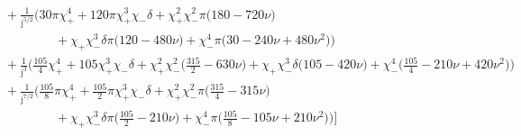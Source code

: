 \documentclass[prd,superscriptaddress,preprintnumbers,tightenlines,nofootinbib, eqsecnum]{revtex4-2}
\newcommand{\nn}{\nonumber}
\begin{document}
\begin{align}
&\qquad\quad + \frac{1}{\bar{\jmath}^{5/2}}\Bigg(30 \pi\chi_{+}^{4} + 120 \pi\chi_{+}^{3}\chi_{-}\delta + \chi_{+}^{2}\chi_{-}^{2}\pi\bigg(180 - 720 \nu\bigg)\nn \\
&\qquad\qquad\qquad\quad + \chi_{+}\chi_{-}^{3}\delta\pi\bigg(120 - 480 \nu\bigg) + \chi_{-}^{4}\pi\bigg(30 - 240 \nu + 480 \nu^{2}\bigg)\Bigg) \nn \\
&\qquad\quad + \frac{1}{\bar{\jmath}^{3}}\Bigg(\frac{105}{4}\chi_{+}^{4} + 105\chi_{+}^{3}\chi_{-}\delta + \chi_{+}^{2}\chi_{-}^{2}\bigg(\frac{315}{2} - 630 \nu\bigg) + \chi_{+}\chi_{-}^{3}\delta\bigg(105 - 420 \nu\bigg) + \chi_{-}^{4}\bigg(\frac{105}{4} - 210 \nu + 420 \nu^{2}\bigg)\Bigg) \nn \\
&\qquad\quad + \frac{1}{\bar{\jmath}^{7/2}}\Bigg(\frac{105}{8}\pi\chi_{+}^{4} + \frac{105}{2}\pi\chi_{+}^{3}\chi_{-}\delta + \chi_{+}^{2}\chi_{-}^{2}\pi\bigg(\frac{315}{4} - 315 \nu\bigg) \nn \\
&\qquad\qquad\qquad\quad + \chi_{+}\chi_{-}^{3}\delta\pi\bigg(\frac{105}{2} - 210 \nu\bigg)   + \chi_{-}^{4}\pi\bigg(\frac{105}{8} - 105 \nu + 210 \nu^{2}\bigg)\Bigg)\Bigg]
\end{align}


\end{document}
